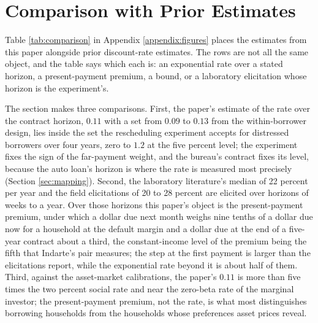\section{Comparison with Prior Estimates}\label{sec:comparison}

Table \ref{tab:comparison} in Appendix \ref{appendix:figures} places the estimates from this paper alongside prior discount-rate estimates. The rows are not all the same object, and the table says which each is: an exponential rate over a stated horizon, a present-payment premium, a bound, or a laboratory elicitation whose horizon is the experiment's.

The section makes three comparisons. First, the paper's estimate of the rate over the contract horizon, $0.11$ with a set from $0.09$ to $0.13$ from the within-borrower design, lies inside the set the rescheduling experiment accepts for distressed borrowers over four years, zero to $1.2$ at the five percent level; the experiment fixes the sign of the far-payment weight, and the bureau's contract fixes its level, because the auto loan's horizon is where the rate is measured most precisely (Section \ref{sec:mapping}). Second, the laboratory literature's median of 22 percent per year \citep{cohen_measuring_2020} and the field elicitations of 20 to 28 percent are elicited over horizons of weeks to a year. Over those horizons this paper's object is the present-payment premium, under which a dollar due next month weighs nine tenths of a dollar due now for a household at the default margin and a dollar due at the end of a five-year contract about a third, the constant-income level of the premium being the fifth that Indarte's pair measures; the step at the first payment is larger than the elicitations report, while the exponential rate beyond it is about half of them. Third, against the asset-market calibrations, the paper's $0.11$ is more than five times the two percent social rate and near the zero-beta rate of the marginal investor; the present-payment premium, not the rate, is what most distinguishes borrowing households from the households whose preferences asset prices reveal.
